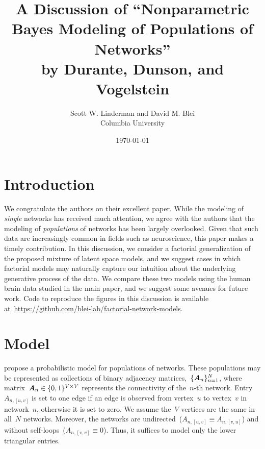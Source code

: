 



\title{A Discussion of ``Nonparametric Bayes Modeling of Populations of Networks''\\
by Durante, Dunson, and Vogelstein}
\author{
  Scott W. Linderman and David M. Blei\\
  Columbia University
}
\date{\today}


\maketitle


\section{Introduction}

We congratulate the authors on their excellent paper.  While the
modeling of \emph{single} networks has received much attention, we agree
with the authors that the modeling of \emph{populations} of
networks has been largely overlooked.  Given that such data are
increasingly common in fields such as neuroscience, this paper makes a
timely contribution.  In this discussion, we consider a factorial
generalization of the proposed mixture of latent space models,
and we suggest cases in which factorial
models may naturally capture our intuition about the
underlying generative process of the data. We compare these two models using the
human brain data studied in the main paper, and we suggest some
avenues for future work.  Code to reproduce the figures in this
discussion is available
at~\url{https://github.com/blei-lab/factorial-network-models}.

\section{Model}
\citet{durante2016nonparametric}
propose a probabilistic model for populations of networks. These populations
may be represented as collections of binary adjacency matrices,~$\{\boldsymbol{A}_n\}_{n=1}^N$,
where matrix~${\boldsymbol{A}_n \in \{0,1\}^{V \times V}}$ represents the
connectivity of the~$n$-th network.  Entry~${A_{n,[u,v]}}$ is set to
one edge if an edge is observed from vertex~$u$ to vertex~$v$ in
network~$n$, otherwise it is set to zero.  We assume the~$V$ vertices
are the same in all~$N$ networks.  Moreover, the networks are
undirected~(${A_{n,[u,v]} \equiv A_{n,[v,u]}}$) and without
self-loops~(${A_{n,[v,v]} \equiv 0}$). Thus, it suffices to model only
the lower triangular entries.


